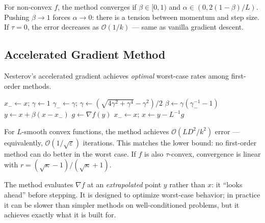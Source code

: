 For non-convex $f$, the method converges if $\beta \in [0, 1)$ and $\alpha \in (0, 2(1 - \beta)/L)$.
Pushing $\beta \to 1$ forces $\alpha \to 0$: there is a tension between momentum and step size.
If $\tau = 0$, the error decreases as $\mathcal{O}(1/k)$ --- same as vanilla gradient descent.


\subsection{Accelerated Gradient Method}\label{ssec:accelerated}

Nesterov's accelerated gradient achieves \textit{optimal} worst-case rates among first-order methods.

\begin{algorithm}
	\caption{Accelerated Gradient (ACCG)}
	\begin{algorithmic}[1]
			\State $x_- \gets x$;\; $\gamma \gets 1$
			\Repeat
				\State $\gamma_- \gets \gamma$;\;
					$\gamma \gets (\sqrt{4\gamma^2 + \gamma^4} - \gamma^2) / 2$
				\State $\beta \gets \gamma(\gamma_-^{-1} - 1)$
				\State $y \gets x + \beta(x - x_-)$
				\State $g \gets \nabla f(y)$
				\State $x_- \gets x$;\; $x \gets y - L^{-1} g$
		\EndProcedure
	\end{algorithmic}
\end{algorithm}

For $L$-smooth convex functions, the method achieves $\mathcal{O}(LD^2/k^2)$ error --- equivalently, $\mathcal{O}(1/\sqrt{\varepsilon})$ iterations.
This matches the lower bound: no first-order method can do better in the worst case.
If $f$ is also $\tau$-convex, convergence is linear with $r = (\sqrt{\kappa} - 1)/(\sqrt{\kappa} + 1)$.

The method evaluates $\nabla f$ at an \textit{extrapolated} point $y$ rather than $x$: it ``looks ahead'' before stepping.
It is designed to optimize worst-case behavior; in practice it can be slower than simpler methods on well-conditioned problems, but it achieves exactly what it is built for.